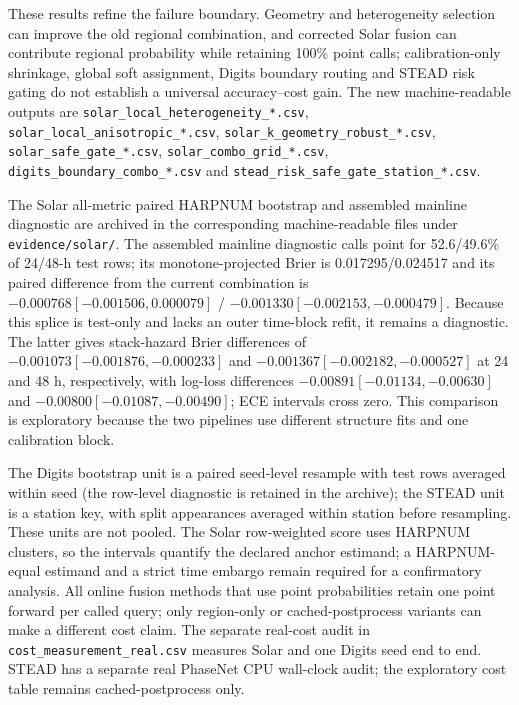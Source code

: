 \documentclass[11pt,a4paper]{article}
\numberwithin{equation}{section}
\theoremstyle{definition}\newtheorem{definition}[theorem]{Definition}
\theoremstyle{remark}\newtheorem{remark}[theorem]{Remark}
\begin{document}
These results refine the failure boundary. Geometry and heterogeneity selection can improve the old regional combination, and corrected Solar fusion can contribute regional probability while retaining 100\% point calls; calibration-only shrinkage, global soft assignment, Digits boundary routing and STEAD risk gating do not establish a universal accuracy--cost gain. The new machine-readable outputs are \texttt{solar\_local\_heterogeneity\_*.csv}, \texttt{solar\_local\_anisotropic\_*.csv}, \texttt{solar\_k\_geometry\_robust\_*.csv}, \texttt{solar\_safe\_gate\_*.csv}, \texttt{solar\_combo\_grid\_*.csv}, \texttt{digits\_boundary\_combo\_*.csv} and \texttt{stead\_risk\_safe\_gate\_station\_*.csv}.

The Solar all-metric paired HARPNUM bootstrap and assembled mainline diagnostic are archived in the corresponding machine-readable files under \texttt{evidence/solar/}. The assembled mainline diagnostic calls point for 52.6/49.6\% of 24/48-h test rows; its monotone-projected Brier is 0.017295/0.024517 and its paired difference from the current combination is $-0.000768[-0.001506,0.000079]$ / $-0.001330[-0.002153,-0.000479]$. Because this splice is test-only and lacks an outer time-block refit, it remains a diagnostic. The latter gives stack-hazard Brier differences of $-0.001073[-0.001876,-0.000233]$ and $-0.001367[-0.002182,-0.000527]$ at 24 and 48 h, respectively, with log-loss differences $-0.00891[-0.01134,-0.00630]$ and $-0.00800[-0.01087,-0.00490]$; ECE intervals cross zero. This comparison is exploratory because the two pipelines use different structure fits and one calibration block.

The Digits bootstrap unit is a paired seed-level resample with test rows averaged within seed (the row-level diagnostic is retained in the archive); the STEAD unit is a station key, with split appearances averaged within station before resampling. These units are not pooled. The Solar row-weighted score uses HARPNUM clusters, so the intervals quantify the declared anchor estimand; a HARPNUM-equal estimand and a strict time embargo remain required for a confirmatory analysis. All online fusion methods that use point probabilities retain one point forward per called query; only region-only or cached-postprocess variants can make a different cost claim. The separate real-cost audit in \texttt{cost\_measurement\_real.csv} measures Solar and one Digits seed end to end. STEAD has a separate real PhaseNet CPU wall-clock audit; the exploratory cost table remains cached-postprocess only.
\end{document}
